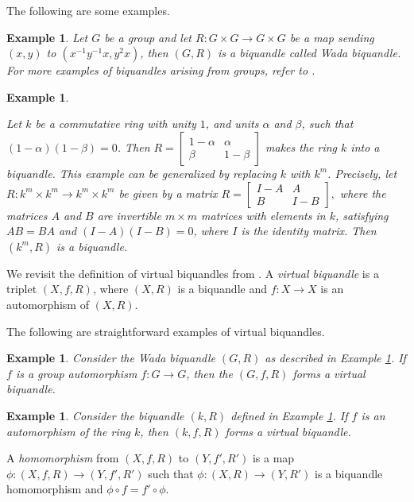 \documentclass[11pt, reqno]{amsart}
\newtheorem{example}[theorem]{Example}
\theoremstyle{definition}
\begin{document}
The following are some examples.
\begin{example}\label{Wada}{\rm
	Let $G$ be a group and let $R\colon G \times G \to G \times G$ be a map sending $(x,y)$ to $(x^{-1}y^{-1}x, y^2x )$, then $(G,R)$ is a biquandle called {\it Wada biquandle}.  For more examples of biquandles arising from groups, refer to \cite{MR1167178}.}
\end{example}

\begin{example} \label{YBEexamples} {\rm 
		Let $k$ be a commutative ring with unity $1$, and units $\alpha$ and $\beta$, such that $(1-\alpha)(1-\beta)=0$. 
		Then   $\displaystyle R= \left[ \begin{array}{cc} 1-\alpha & \alpha \\ \beta & 1-\beta \end{array} \right] $ makes the ring $k$ into a biquandle.   This example can be generalized by replacing $k$ with $k^m$.  Precisely, let $R\colon k^m \times k^m \rightarrow  k^m \times k^m $ be given by a matrix 
		$\displaystyle R= \left[ \begin{array}{cc} I - A & A \\ B & I-B \end{array} \right], $
		where the matrices $A$ and $B$ are invertible $m \times m$ matrices with elements in $k$, satisfying $AB=BA$ and $(I-A)(I-B)=0$, where $I$ is the identity matrix.  Then  $(k^m,R)$ is a biquandle. 
		
} \end{example}


We revisit the definition of virtual biquandles from \cite{MR2191942}. A {\it virtual biquandle} is a triplet $(X,f,R)$, where $(X,R)$ is a biquandle and $f: X \to X$ is an automorphism of $(X,R)$.

The following are straightforward examples of virtual biquandles.
\begin{example}\label{Vwada}
{\rm	Consider the Wada biquandle  $(G,R)$ as described in Example \ref{Wada}.  If $f$ is a group automorphism $f:G \to G$, then the $(G,f,R)$ forms a virtual biquandle.}
\end{example}

\begin{example}\label{Vlinear}
{\rm	Consider the biquandle $(k,R)$ defined in Example \ref{YBEexamples}. If $f$ is an automorphism of the ring $k$, then $(k,f,R)$ forms a virtual biquandle.
}
\end{example}


A {\it homomorphism} from $(X,f,R)$ to $(Y,f',R')$ is a map $\phi: (X,f,R) \to (Y,f', R')$ such that $\phi:(X,R) \to (Y, R')$ is a biquandle homomorphism and $\phi \circ f= f' \circ \phi$.
\end{document}
